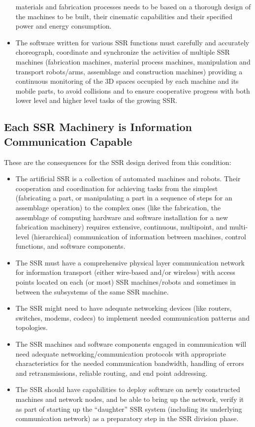 \begin{itemize}
materials and fabrication processes needs to be based on a thorough
design of the machines to be built, their cinematic capabilities and
their specified power and energy consumption.
\item The software written for various SSR functions must carefully and
accurately choreograph, coordinate and synchronize the activities of
multiple SSR machines (fabrication machines, material process machines,
manipulation and transport robots/arms, assemblage and construction
machines) providing a continuous monitoring of the 3D spaces occupied
by each machine and its mobile parts, to avoid collisions and to ensure
cooperative progress with both lower level and higher level tasks of
the growing SSR.
\end{itemize}

\subsection[Each SSR Machinery is Information Communication
Capable]{Each SSR Machinery is Information Communication Capable}

These are the consequences for
the SSR design derived from this condition:

\begin{itemize}
\item The artificial SSR is a collection of automated machines and
robots. Their cooperation and coordination for achieving tasks from the
simplest (fabricating a part, or manipulating a part in a sequence of
steps for an assemblage operation) to the complex ones (like the
fabrication, the assemblage of computing hardware and software
installation for a new fabrication machinery) requires extensive,
continuous, multipoint, and multi-level (hierarchical) communication of
information between machines, control functions, and software
components.
\item The SSR must have a comprehensive physical layer communication
network for information transport (either wire-based and/or wireless)
with access points located on each (or most) SSR machines/robots and
sometimes in between the subsystems of the same SSR machine.
\item The SSR might need to have adequate networking devices (like
routers, switches, modems, codecs) to implement needed communication
patterns and topologies.
\item The SSR machines and software components engaged in communication
will need adequate networking/communication protocols with appropriate
characteristics for the needed communication bandwidth, handling of
errors and retransmissions, reliable routing, and end point addressing.
\item The SSR should have capabilities to deploy software on newly
constructed machines and network nodes, and be able to bring up the
network, verify it as part of starting up the “daughter” SSR system
(including its underlying communication network) as a preparatory step
in the SSR division phase.
\end{itemize}

